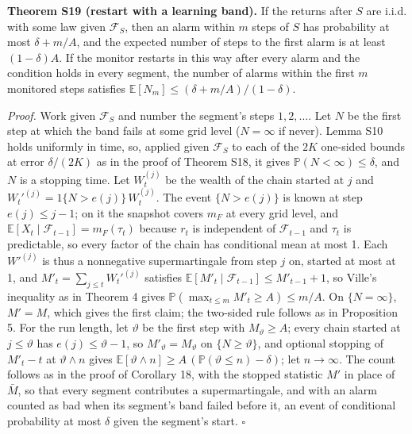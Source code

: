 \documentclass[
]{article}
\begin{document}
\textbf{Theorem S19 (restart with a learning band).} If the returns
after \(S\) are i.i.d. with some law given \(\mathcal{F}_S\), then an
alarm within \(m\) steps of \(S\) has probability at most
\(\delta + m/A\), and the expected number of steps to the first alarm is
at least \((1 - \delta)A\). If the monitor restarts in this way after
every alarm and the condition holds in every segment, the number of
alarms within the first \(m\) monitored steps satisfies
\(\mathbb{E}[N_m] \le (\delta + m/A)/(1 - \delta)\).

\emph{Proof.} Work given \(\mathcal{F}_S\) and number the segment's
steps \(1, 2, \dots\). Let \(N\) be the first step at which the band
fails at some grid level (\(N = \infty\) if never). Lemma S10 holds
uniformly in time, so, applied given \(\mathcal{F}_S\) to each of the
\(2K\) one-sided bounds at error \(\delta/(2K)\) as in the proof of
Theorem S18, it gives \(\mathbb{P}(N < \infty) \le \delta\), and \(N\)
is a stopping time. Let \(W_t^{(j)}\) be the wealth of the chain started
at \(j\) and \(W_t'^{(j)} = 1\lbrace N > e(j)\rbrace\,W_t^{(j)}\). The
event \(\lbrace N > e(j)\rbrace\) is known at step \(e(j) \le j - 1\);
on it the snapshot covers \(m_F\) at every grid level, and
\(\mathbb{E}[X_t \mid \mathcal{F}_{t-1}] = m_F(\tau_t)\) because \(r_t\)
is independent of \(\mathcal{F}_{t-1}\) and \(\tau_t\) is predictable,
so every factor of the chain has conditional mean at most 1. Each
\(W'^{(j)}\) is thus a nonnegative supermartingale from step \(j\) on,
started at most at 1, and \(M'_t = \sum_{j \le t} W_t'^{(j)}\) satisfies
\(\mathbb{E}[M'_t \mid \mathcal{F}_{t-1}] \le M'_{t-1} + 1\), so Ville's
inequality as in Theorem 4 gives
\(\mathbb{P}(\max_{t \le m} M'_t \ge A) \le m/A\). On
\(\lbrace N = \infty\rbrace\), \(M' = M\), which gives the first claim;
the two-sided rule follows as in Proposition 5. For the run length, let
\(\vartheta\) be the first step with \(M_\vartheta \ge A\); every chain
started at \(j \le \vartheta\) has \(e(j) \le \vartheta - 1\), so
\(M'_\vartheta = M_\vartheta\) on \(\lbrace N \ge \vartheta\rbrace\),
and optional stopping of \(M'_t - t\) at \(\vartheta \wedge n\) gives
\(\mathbb{E}[\vartheta \wedge n] \ge A\,(\mathbb{P}(\vartheta \le n) - \delta)\);
let \(n \to \infty\). The count follows as in the proof of Corollary 18,
with the stopped statistic \(M'\) in place of \(\bar M\), so that every
segment contributes a supermartingale, and with an alarm counted as bad
when its segment's band failed before it, an event of conditional
probability at most \(\delta\) given the segment's start. \(\square\)
\end{document}

